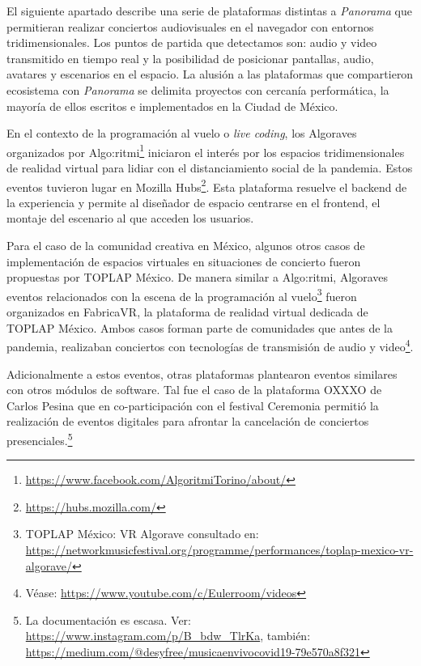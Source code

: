 

El siguiente apartado describe una serie de plataformas distintas a \textit{Panorama} que permitieran realizar conciertos audiovisuales en el navegador con entornos tridimensionales. Los puntos de partida que detectamos son: audio y video transmitido en tiempo real y la posibilidad de posicionar pantallas, audio, avatares y escenarios en el espacio. La alusión a las plataformas que compartieron ecosistema con \textit{Panorama} se delimita proyectos con cercanía performática, la mayoría de ellos escritos e implementados en la Ciudad de México. 

En el contexto de la programación al vuelo o \textit{live coding}, los Algoraves organizados por Algo:ritmi\footnote{\url{https://www.facebook.com/AlgoritmiTorino/about/}} iniciaron el interés por los espacios tridimensionales de realidad virtual para lidiar con el distanciamiento social de la pandemia. Estos eventos tuvieron lugar en Mozilla Hubs\footnote{\url{https://hubs.mozilla.com/}}. Esta plataforma resuelve el backend de la experiencia y permite al diseñador de espacio centrarse en el frontend, el montaje del escenario al que acceden los usuarios.


Para el caso de la comunidad creativa en México, algunos otros casos de implementación de espacios virtuales en situaciones de concierto fueron propuestas por TOPLAP México. De manera similar a Algo:ritmi, Algoraves eventos relacionados con la escena de la programación al vuelo\footnote{TOPLAP México: VR Algorave consultado en: \url{https://networkmusicfestival.org/programme/performances/toplap-mexico-vr-algorave/}} fueron organizados en FabricaVR, la plataforma de realidad virtual dedicada de TOPLAP México. Ambos casos forman parte de comunidades que antes de la pandemia, realizaban conciertos con tecnologías de transmisión de audio y video\footnote{Véase: \url{https://www.youtube.com/c/Eulerroom/videos}}.%

Adicionalmente a estos eventos, otras plataformas plantearon eventos similares con otros módulos de software. Tal fue el caso de la plataforma OXXXO de Carlos Pesina que en co-participación con el festival Ceremonia permitió la realización de eventos digitales para afrontar la cancelación de conciertos presenciales.\footnote{La documentación es escasa. Ver: \url{https://www.instagram.com/p/B_bdw_TlrKa}, también: \url{https://medium.com/@desyfree/musicaenvivocovid19-79e570a8f321}}

